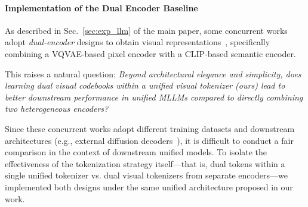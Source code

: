 \belowrulesep=0pt\aboverulesep=0pt

\begin{table}[t]
\centering
{}
\caption{Training hyper-parameters.}
\label{tab:hyper_params}
\end{table}

\paragraph{Implementation of the Dual Encoder Baseline}
As described in Sec.~\ref{sec:exp_llm} of the main paper, some concurrent works adopt \textit{dual-encoder} designs to obtain visual representations~\citep{huang2025illume+}, specifically combining a VQVAE-based pixel encoder with a CLIP-based semantic encoder.

This raises a natural question:
\textit{Beyond architectural elegance and simplicity, does learning dual visual codebooks within a unified visual tokenizer (ours) lead to better downstream performance in unified MLLMs compared to directly combining two heterogeneous encoders?}

Since these concurrent works adopt different training datasets and downstream architectures (e.g., external diffusion decoders~\citep{latentdiffusion}), it is difficult to conduct a fair comparison in the context of downstream unified models. To isolate the effectiveness of the tokenization strategy itself---that is, dual tokens within a single unified tokenizer vs. dual visual tokenizers from separate encoders---we implemented both designs under the same unified architecture proposed in our work.

